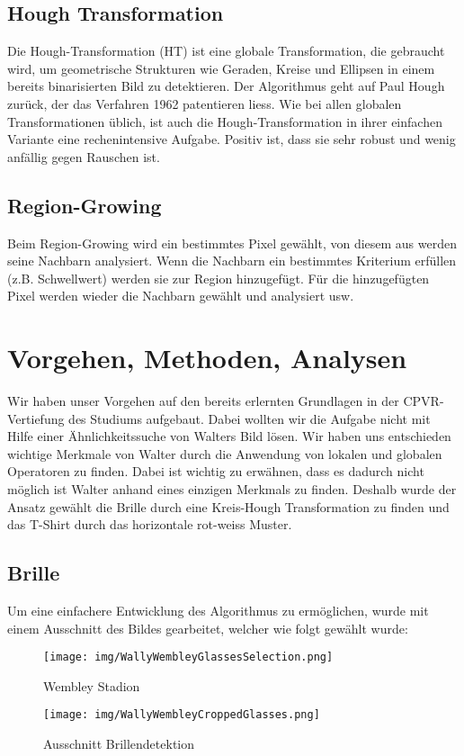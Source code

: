 \documentclass[paper=a4,fontsize=12pt]{scrartcl}
\begin{document}
\subsection*{Hough Transformation}
Die Hough-Transformation (HT) ist eine globale Transformation, die gebraucht wird, um
geometrische Strukturen wie Geraden, Kreise und Ellipsen in einem bereits binarisierten
Bild zu detektieren. Der Algorithmus geht auf Paul Hough zurück, der das Verfahren 1962
patentieren liess.
Wie bei allen globalen Transformationen üblich, ist auch die Hough-Transformation in
ihrer einfachen Variante eine rechenintensive Aufgabe. Positiv ist, dass sie sehr robust
und wenig anfällig gegen Rauschen ist.
\subsection*{Region-Growing}
Beim Region-Growing wird ein bestimmtes Pixel gewählt, von diesem aus werden seine Nachbarn analysiert. Wenn die Nachbarn ein bestimmtes Kriterium erfüllen (z.B. Schwellwert) werden sie zur Region hinzugefügt. Für die hinzugefügten Pixel werden wieder die Nachbarn gewählt und analysiert usw.
\newpage
\section*{Vorgehen, Methoden, Analysen}
Wir haben unser Vorgehen auf den bereits erlernten Grundlagen in der CPVR-Vertiefung des Studiums aufgebaut. Dabei wollten wir die Aufgabe nicht mit Hilfe einer Ähnlichkeitssuche von Walters Bild lösen. Wir haben uns entschieden wichtige Merkmale von Walter durch die Anwendung von lokalen und globalen Operatoren zu finden. Dabei ist wichtig zu erwähnen, dass es dadurch nicht möglich ist Walter anhand eines einzigen Merkmals zu finden. Deshalb wurde der Ansatz gewählt die Brille durch eine Kreis-Hough Transformation zu finden und das T-Shirt durch das horizontale rot-weiss Muster.
\subsection*{Brille}
Um eine einfachere Entwicklung des Algorithmus zu ermöglichen, wurde mit einem Ausschnitt des Bildes gearbeitet, welcher wie folgt gewählt wurde:

\begin{figure}[htbp]
\centering
\begin{minipage}{.5\textwidth}
  \centering
  \texttt{[image: img/WallyWembleyGlassesSelection.png]}
  \caption{Wembley Stadion}
\end{minipage}%
\begin{minipage}{.5\textwidth}
  \centering
  \texttt{[image: img/WallyWembleyCroppedGlasses.png]}
  \caption{Ausschnitt Brillendetektion}
\end{minipage}
\end{figure}
\end{document}
